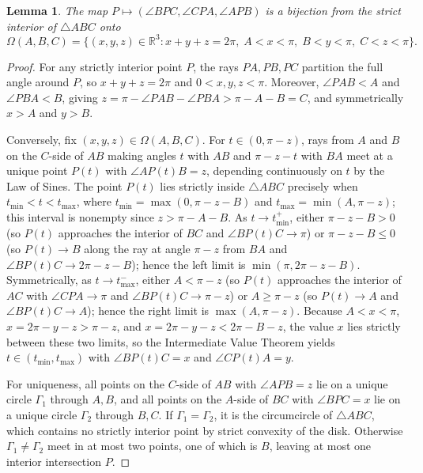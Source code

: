 \documentclass[11pt]{article}
\newtheorem{lemma}[theorem]{Lemma}
\begin{document}
\begin{lemma}\label{lem:geom}
The map $P \mapsto (\angle BPC, \angle CPA, \angle APB)$ is a bijection from the strict interior of $\triangle ABC$ onto
\[
  \Omega(A, B, C) = \{(x, y, z) \in \mathbb{R}^3 : x + y + z = 2\pi,\; A < x < \pi,\; B < y < \pi,\; C < z < \pi\}.
\]
\end{lemma}

\begin{proof}
For any strictly interior point $P$, the rays $PA, PB, PC$ partition the full angle around $P$, so $x + y + z = 2\pi$ and $0 < x, y, z < \pi$. Moreover, $\angle PAB < A$ and $\angle PBA < B$, giving $z = \pi - \angle PAB - \angle PBA > \pi - A - B = C$, and symmetrically $x > A$ and $y > B$.

Conversely, fix $(x, y, z) \in \Omega(A, B, C)$. For $t \in (0, \pi - z)$, rays from $A$ and $B$ on the $C$-side of $AB$ making angles $t$ with $AB$ and $\pi - z - t$ with $BA$ meet at a unique point $P(t)$ with $\angle AP(t)B = z$, depending continuously on $t$ by the Law of Sines. The point $P(t)$ lies strictly inside $\triangle ABC$ precisely when $t_{\min} < t < t_{\max}$, where $t_{\min} = \max(0, \pi - z - B)$ and $t_{\max} = \min(A, \pi - z)$; this interval is nonempty since $z > \pi - A - B$. As $t \to t_{\min}^+$, either $\pi - z - B > 0$ (so $P(t)$ approaches the interior of $BC$ and $\angle BP(t)C \to \pi$) or $\pi - z - B \le 0$ (so $P(t) \to B$ along the ray at angle $\pi - z$ from $BA$ and $\angle BP(t)C \to 2\pi - z - B$); hence the left limit is $\min(\pi, 2\pi - z - B)$. Symmetrically, as $t \to t_{\max}^-$, either $A < \pi - z$ (so $P(t)$ approaches the interior of $AC$ with $\angle CPA \to \pi$ and $\angle BP(t)C \to \pi - z$) or $A \ge \pi - z$ (so $P(t) \to A$ and $\angle BP(t)C \to A$); hence the right limit is $\max(A, \pi - z)$. Because $A < x < \pi$, $x = 2\pi - y - z > \pi - z$, and $x = 2\pi - y - z < 2\pi - B - z$, the value $x$ lies strictly between these two limits, so the Intermediate Value Theorem yields $t \in (t_{\min}, t_{\max})$ with $\angle BP(t)C = x$ and $\angle CP(t)A = y$.

For uniqueness, all points on the $C$-side of $AB$ with $\angle APB = z$ lie on a unique circle $\Gamma_1$ through $A, B$, and all points on the $A$-side of $BC$ with $\angle BPC = x$ lie on a unique circle $\Gamma_2$ through $B, C$. If $\Gamma_1 = \Gamma_2$, it is the circumcircle of $\triangle ABC$, which contains no strictly interior point by strict convexity of the disk. Otherwise $\Gamma_1 \ne \Gamma_2$ meet in at most two points, one of which is $B$, leaving at most one interior intersection $P$.
\end{proof}
\end{document}
